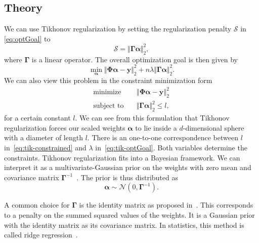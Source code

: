 \subsection{Theory}
We can use Tikhonov regularization by setting the regularization penalty
\(\mathcal{S}\) in \cref{eq:optGoal} to
\begin{equation}\label{eq:tik-langrangian}
\mathcal{S} = \Vert \bm{\Gamma} \bm{\alpha} \Vert_2^2,
\end{equation}
where \(\bm{\Gamma}\) is a linear operator.
The overall optimization goal is then given by
\begin{equation}\label{eq:tik-optGoal}
 \min_{\bm{\alpha}} \Vert \bm{\Phi} \bm{\alpha} - \bm{y} \Vert_2^2 + n \lambda \Vert \bm{\Gamma} \bm{\alpha} \Vert_2^2.
\end{equation}
We can also view this problem in the constraint minimization form
\begin{align}\label{eq:tik-constrained}
 \text{minimize} \quad &
 \left\Vert  \bm{\Phi} \bm{\alpha} - \bm{y}  \right\Vert_2^2 \nonumber \\
\text{subject to} \quad &  \Vert \bm{\Gamma} \bm{\alpha}  \Vert_2^2 \leq l,
\end{align}
for a certain constant \(l\). 
We can see from this formulation that Tikhonov regularization forces our scaled weights \(\bm{\alpha}\) to lie inside a \(d\)-dimensional sphere with a diameter of length \(l\).
There is an one-to-one correspondence between \(l\) in~\cref{eq:tik-constrained} and \(\lambda\) in~\cref{eq:tik-optGoal}.
Both variables determine the constraints.
Tikhonov regularization fits into a Bayesian framework.
We can interpret it as a multivariate-Gaussian prior on the weights with zero mean and covariance matrix \(\bm{\Gamma}^{-1}\)~\cite{stat-inverse}.
The prior is thus distributed as
\begin{equation}\label{eq:diagonal-prior}
\bm{\alpha} \sim \mathcal{N} (0, \bm{\Gamma}^{-1}).
\end{equation}

A common choice for \(\bm{\Gamma}\) is the identity matrix as proposed in~\cite{spatAdaptGrid}.
This corresponds to a penalty on the summed squared values of the weights.
It is a Gaussian prior with the identity matrix as its covariance matrix.
In statistics, this method is called ridge regression~\cite{esl}.

